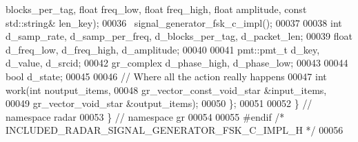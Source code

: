 \begin{DoxyCode}
      blocks_per_tag, \textcolor{keywordtype}{float} freq\_low, \textcolor{keywordtype}{float} freq\_high, \textcolor{keywordtype}{float} amplitude, \textcolor{keyword}{const} 
      std::string& len\_key);
00036       ~signal_generator_fsk_c_impl();
00037       
00038       \textcolor{keywordtype}{int} d_samp_rate, d_samp_per_freq, d_blocks_per_tag, d_packet_len;
00039       \textcolor{keywordtype}{float} d_freq_low, d_freq_high, d_amplitude;
00040       
00041       pmt::pmt\_t d_key, d_value, d_srcid;
00042       gr\_complex d_phase_high, d_phase_low;
00043       
00044       \textcolor{keywordtype}{bool} d_state;
00045 
00046       \textcolor{comment}{// Where all the action really happens}
00047       \textcolor{keywordtype}{int} work(\textcolor{keywordtype}{int} noutput\_items,
00048            gr\_vector\_const\_void\_star &input\_items,
00049            gr\_vector\_void\_star &output\_items);
00050     \};
00051 
00052   \} \textcolor{comment}{// namespace radar}
00053 \} \textcolor{comment}{// namespace gr}
00054 
00055 \textcolor{preprocessor}{#endif }\textcolor{comment}{/* INCLUDED\_RADAR\_SIGNAL\_GENERATOR\_FSK\_C\_IMPL\_H */}\textcolor{preprocessor}{}
00056 
\end{DoxyCode}
